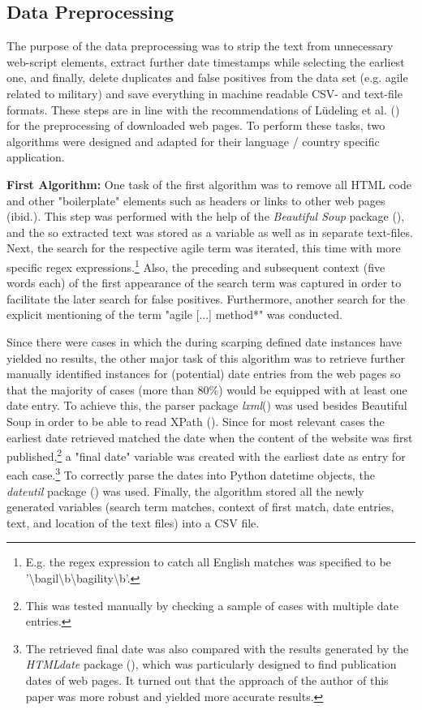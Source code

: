 \subsection{Data Preprocessing}
The purpose of the data  preprocessing was to strip the text from unnecessary web-script elements, extract further date timestamps while selecting the earliest one, and finally, delete duplicates and false positives from the data set (e.g. agile related to military) and save everything in machine readable CSV- and text-file formats. These steps are in line with the recommendations of Lüdeling et al. (\cite*[p. 19]{Ludeling2015}) for the preprocessing of downloaded web pages. To perform these tasks, two algorithms were designed and adapted for their language / country specific application. \par 
\textbf{First Algorithm:} One task of the first algorithm was to remove all HTML code and other "boilerplate" elements such as headers or links to other web pages (ibid.). This step was performed with the help of the \textit{Beautiful Soup} package (\cite{Richardson2007}), and the so extracted text was stored as a variable as well as in separate text-files. Next, the search for the respective agile term was iterated, this time with more specific regex expressions.\footnote{E.g. the regex expression to catch all English matches was specified to be '\textbackslash bagil\textbackslash b\textbar \textbackslash bagility\textbackslash b'.} Also, the preceding and subsequent context (five words each) of the first appearance of the search term was captured in order to facilitate the later search for false positives. Furthermore, another search for the explicit mentioning of the term "agile [...] method*" was conducted.\par 
Since there were cases in which the during scarping defined date instances have yielded no results, the other major task of this algorithm was to retrieve further manually identified instances for (potential) date entries from the web pages so that the majority of cases (more than 80\%) would be equipped with at least one date entry. To achieve this, the parser package \textit{lxml}(\cite{Faassen2006}) was used besides Beautiful Soup in order to be able to read XPath (\cite{Clark1999}). Since for most relevant cases the earliest date retrieved matched the date when the content of the website was first published,\footnote{This was tested manually by checking a sample of cases with multiple date entries.} a "final date" variable was created with the earliest date as entry for each case.\footnote{The retrieved final date was also compared with the results generated by the \textit{HTMLdate} package (\cite{Barbaresi2020}), which was particularly designed to find publication dates of web pages. It turned out that the approach of the author of this paper was more robust and yielded more accurate results.} To correctly parse the dates into Python datetime objects, the \textit{dateutil} package (\cite{Niemeyer2003}) was used. Finally, the algorithm stored all the newly generated variables (search term matches, context of first match, date entries, text, and location of the text files) into a CSV file.\par
